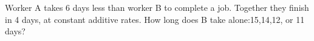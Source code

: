 Worker A takes 6 days less than worker B to complete a job. Together they finish in 4 days, at constant additive rates. How long does B take alone:15,14,12, or 11 days?
